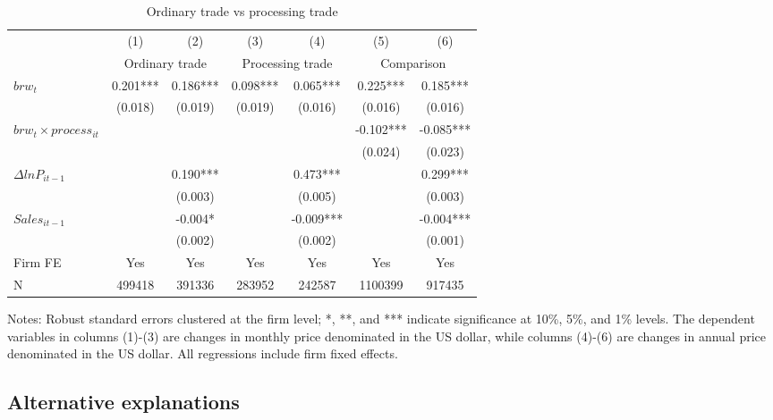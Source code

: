 \begin{table}[h]
    \centering
    \caption{Ordinary trade vs processing trade}
    \begin{threeparttable}
    \begin{tabular}{lcccccc}
        \toprule
        & (1)   & (2)   & (3)   & (4)   & (5)   & (6) \\
          & \multicolumn{2}{c}{Ordinary trade}  & \multicolumn{2}{c}{Processing trade} & \multicolumn{2}{c}{Comparison}\\
        \midrule
        $brw_t$   & 0.201*** & 0.186*** & 0.098*** & 0.065*** & 0.225*** & 0.185*** \\
              & (0.018) & (0.019) & (0.019) & (0.016) & (0.016) & (0.016) \\
        $brw_t \times process_{it}$ &       &       &       &       & -0.102*** & -0.085*** \\
              &       &       &       &       & (0.024) & (0.023) \\
        $\Delta ln P_{it-1}$ &       & 0.190*** &       & 0.473*** &       & 0.299*** \\
              &       & (0.003) &       & (0.005) &       & (0.003) \\
        $Sales_{it-1}$ &       & -0.004* &       & -0.009*** &       & -0.004*** \\
              &       & (0.002) &       & (0.002) &       & (0.001) \\
        Firm FE & Yes   & Yes   & Yes   & Yes   & Yes   & Yes \\
        N     & 499418 & 391336 & 283952 & 242587 & 1100399 & 917435 \\
        \bottomrule
    \end{tabular}
        \begin{tablenotes}
            \footnotesize
            \item Notes: Robust standard errors clustered at the firm level;  *, **, and *** indicate significance at 10\%, 5\%, and 1\% levels. The dependent variables in columns (1)-(3) are changes in monthly price denominated in the US dollar, while columns (4)-(6) are changes in annual price denominated in the US dollar. All regressions include firm fixed effects.
	\end{tablenotes}
    \end{threeparttable}
    \label{tab.process}
\end{table}

\subsection{Alternative explanations}

